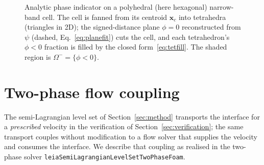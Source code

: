 \documentclass[preprint,3p,11pt]{elsarticle}
\newcommand{\psilev}{\psi}                       %
\begin{document}
\begin{figure}[t]
  \centering
  \caption{Analytic phase indicator on a polyhedral (here hexagonal) narrow-band cell.
  The cell is fanned from its centroid $\mathbf{x}_c$ into tetrahedra (triangles in 2D);
  the signed-distance plane $\phi=0$ reconstructed from $\psilev$
  (dashed, Eq.~\eqref{eq:planefit}) cuts the cell, and each tetrahedron's $\phi<0$
  fraction is filled by the closed form~\eqref{eq:tetfill}. The shaded region is
  $\Omega^-=\{\phi<0\}$.}
  \label{fig:tet}
\end{figure}

\section{Two-phase flow coupling}
\label{sec:twophase}
The semi-Lagrangian level set of Section~\ref{sec:method} transports the interface for a
\emph{prescribed} velocity in the verification of Section~\ref{sec:verification}; the same
transport couples without modification to a flow solver that supplies the velocity and
consumes the interface. We describe that coupling as realised in the two-phase solver
\texttt{leiaSemiLagrangianLevelSetTwoPhaseFoam}.
\end{document}
